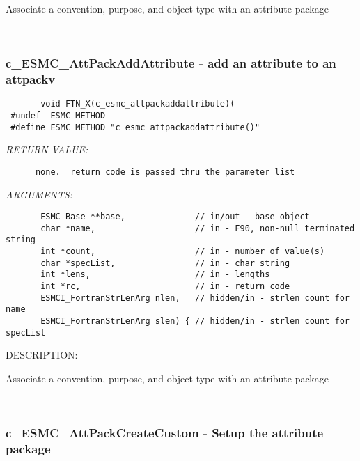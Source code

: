        Associate a convention, purpose, and object type with an attribute package
   
 
\mbox{}\hrulefill\ 
 
\subsubsection [c\_ESMC\_AttPackAddAttribute] {c\_ESMC\_AttPackAddAttribute - add an attribute to an attpackv}


  
\begin{verbatim}       void FTN_X(c_esmc_attpackaddattribute)(
 #undef  ESMC_METHOD
 #define ESMC_METHOD "c_esmc_attpackaddattribute()"\end{verbatim}{\em RETURN VALUE:}
\begin{verbatim}      none.  return code is passed thru the parameter list\end{verbatim}{\em ARGUMENTS:}
\begin{verbatim}       ESMC_Base **base,              // in/out - base object
       char *name,                    // in - F90, non-null terminated string
       int *count,                    // in - number of value(s)
       char *specList,                // in - char string
       int *lens,                     // in - lengths
       int *rc,                       // in - return code
       ESMCI_FortranStrLenArg nlen,   // hidden/in - strlen count for name
       ESMCI_FortranStrLenArg slen) { // hidden/in - strlen count for specList\end{verbatim}
{\sf DESCRIPTION:\\ }


       Associate a convention, purpose, and object type with an attribute package
   
 
\mbox{}\hrulefill\ 
 
\subsubsection [c\_ESMC\_AttPackCreateCustom] {c\_ESMC\_AttPackCreateCustom - Setup the attribute package}


